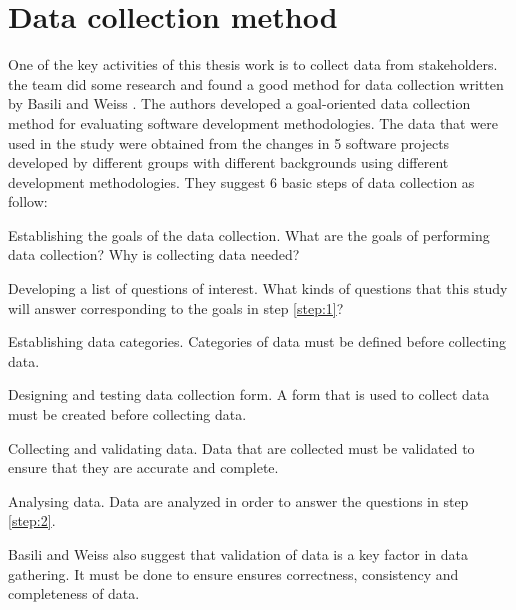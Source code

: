 
\section{Data collection method}
One of the key activities of this thesis work is to collect data from stakeholders. the team did some research and found a good method for data collection written by Basili and Weiss \cite{Basili}. The authors developed a goal-oriented data collection method for evaluating software development methodologies. The data that were used in the study were obtained from the changes in 5 software projects developed by different groups with different backgrounds using different development methodologies. They suggest 6 basic steps of data collection as follow:\\[0.1cm]

\begin{step} \label{step:1}
Establishing the goals of the data collection. What are the goals of performing data collection? Why is collecting data needed?
\end{step}

\begin{step} \label{step:2}
Developing a list of questions of interest. What kinds of questions that this study will answer corresponding to the goals in step \ref{step:1}?
\end{step}

\begin{step} \label{step:3}
Establishing data categories. Categories of data must be defined before collecting data.
\end{step}

\begin{step} \label{step:4}
Designing and testing data collection form. A form that is used to collect data must be created before collecting data.
\end{step}

\begin{step} \label{step:5}
Collecting and validating data. Data that are collected must be validated to ensure that they are accurate and complete.
\end{step}

\begin{step} \label{step:6}
Analysing data. Data are analyzed in order to answer the questions in step \ref{step:2}.
\end{step}

Basili and Weiss also suggest that validation of data is a key factor in data gathering. It must be done to ensure ensures correctness, consistency and completeness of data.